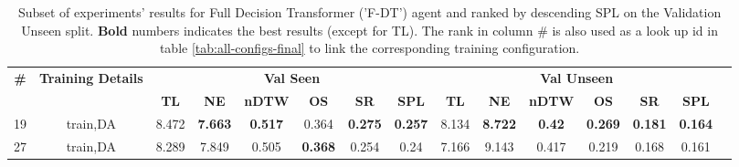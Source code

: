 \begin{table}
\centering
\caption{\label{tab:f_dt_dagger}Subset of experiments' results for Full Decision Transformer ('F-DT') agent and ranked by descending SPL on the Validation Unseen split. \textbf{Bold} numbers indicates the best results (except for TL). The rank in column \# is also used as a look up id in table \ref{tab:all-configs-final} to link the corresponding training configuration.}
\begin{tabular}{@{\hskip3pt}c@{\hskip3pt}c@{\hskip3pt}c@{\hskip3pt}c@{\hskip3pt}c@{\hskip3pt}c@{\hskip3pt}c@{\hskip3pt}c@{\hskip3pt}c@{\hskip3pt}c@{\hskip3pt}c@{\hskip3pt}c@{\hskip3pt}c@{\hskip3pt}c@{\hskip3pt}c}
\toprule
                                  \textbf{\#} & \textbf{Training Details} & \multicolumn{6}{c}{\textbf{Val Seen}} & \multicolumn{6}{c}{\textbf{Val Unseen}} \\
\cmidrule(l){3-8}\cmidrule(l){9-14}\textbf{~} &                \textbf{~} &       \textbf{TL} &     \textbf{NE} &   \textbf{nDTW} &     \textbf{OS} &     \textbf{SR} &    \textbf{SPL} &         \textbf{TL} &     \textbf{NE} &  \textbf{nDTW} &     \textbf{OS} &     \textbf{SR} &    \textbf{SPL} \\
\midrule
                                           19 &                  train,DA &             8.472 &  \textbf{7.663} &  \textbf{0.517} &           0.364 &  \textbf{0.275} &  \textbf{0.257} &               8.134 &  \textbf{8.722} &  \textbf{0.42} &  \textbf{0.269} &  \textbf{0.181} &  \textbf{0.164} \\
                                           27 &                  train,DA &             8.289 &           7.849 &           0.505 &  \textbf{0.368} &           0.254 &            0.24 &               7.166 &           9.143 &          0.417 &           0.219 &           0.168 &           0.161 \\
\bottomrule
\end{tabular}
\end{table}
